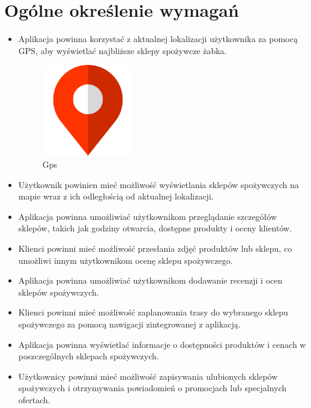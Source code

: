 \newpage
\section{Ogólne określenie wymagań}		%
\begin{itemize}
	\item Aplikacja powinna korzystać z aktualnej lokalizacji użytkownika za pomocą GPS, aby wyświetlać najbliższe sklepy spożywcze żabka.
	\begin{figure}[!hbt]
		\begin{center}
			\includegraphics[width=4cm]{rys/gps-icon.png}
			\caption{Gps}
			\label{rys:gps-icon}
		\end{center}
	\end{figure}
	\item Użytkownik powinien mieć możliwość wyświetlania sklepów spożywczych na mapie wraz z ich odległością od aktualnej lokalizacji.
	\item Aplikacja powinna umożliwiać użytkownikom przeglądanie szczegółów sklepów, takich jak godziny otwarcia, dostępne produkty i oceny klientów.
	\item Klienci powinni mieć możliwość przesłania zdjęć produktów lub sklepu, co umożliwi innym użytkownikom ocenę sklepu spożywczego.
	\item Aplikacja powinna umożliwiać użytkownikom dodawanie recenzji i ocen sklepów spożywczych.
	\item Klienci powinni mieć możliwość zaplanowania trasy do wybranego sklepu spożywczego za pomocą nawigacji zintegrowanej z aplikacją.
	\item Aplikacja powinna wyświetlać informacje o dostępności produktów i cenach w poszczególnych sklepach spożywczych.
	\item Użytkownicy powinni mieć możliwość zapisywania ulubionych sklepów spożywczych i otrzymywania powiadomień o promocjach lub specjalnych ofertach.	
\end{itemize}

